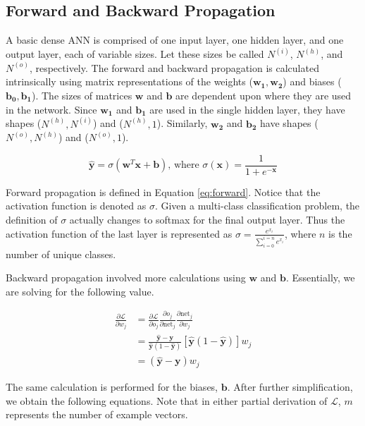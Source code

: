 \documentclass[letterpaper]{article} %
\begin{document}
\subsection{Forward and Backward Propagation}
A basic dense ANN is comprised of one input layer, one hidden layer,
and one output layer, each of variable sizes.
Let these sizes be called $N^{(i)}$, $N^{(h)}$, and $N^{(o)}$, respectively.
The forward and backward propagation
is calculated intrinsically using matrix representations of the
weights ($\mathbf{w_1},\mathbf{w_2}$) and biases ($\mathbf{b_0},\mathbf{b_1}$).
The sizes of matrices $\mathbf{w}$ and $\mathbf{b}$ are dependent upon where they are used
in the network.
Since $\mathbf{w_1}$ and $\mathbf{b_1}$ are used in the single hidden layer,
they have shapes
($N^{(h)}, N^{(i)}$) and ($N^{(h)}, 1$).
Similarly, $\mathbf{w_2}$ and $\mathbf{b_2}$ have shapes
($N^{(o)}, N^{(h)}$) and ($N^{(o)}, 1$).

\begin{equation}
\label{eq:forward}
\hat{\mathbf{y}} = \sigma(\mathbf{w}^T\mathbf{x} + \mathbf{b}) \text{, where } \sigma(\mathbf{x}) = \frac{1}{1 + e^{-\mathbf{x}}}
\end{equation}

Forward propagation is defined in Equation \ref{eq:forward}.
Notice that the activation function is denoted as $\sigma$.
Given a multi-class classification problem,
the definition of $\sigma$ actually changes to softmax for the final output layer.
Thus the activation function of the last layer is represented as
$\sigma = \frac{e^{x_i}}{\sum_{i=0}^{i=n}e^{x_i}}$,
where $n$ is the number of unique classes.

Backward propagation involved more calculations using $\mathbf{w}$ and $\mathbf{b}$.
Essentially, we are solving for the following value.

\begin{equation}
\label{eq:backward}
\begin{split}
\frac{\partial \mathcal{L}}{\partial w_j} &=
\frac{\partial \mathcal{L}}{\partial o_j}
\frac{\partial o_j}{\partial \text{net}_j}
\frac{\partial \text{net}_j}{\partial w_j} \\
&=
\frac{\hat{\mathbf{y}} - \mathbf{y}}{\hat{\mathbf{y}}(1 - \hat{\mathbf{y}})}
[\hat{\mathbf{y}}(1 - \hat{\mathbf{y}})]
w_j \\
&=
(\hat{\mathbf{y}} - \mathbf{y})w_j
\end{split}
\end{equation}

The same calculation is performed for the biases, $\mathbf{b}$.
After further simplification, we obtain the following equations.
Note that in either partial derivation of $\mathcal{L}$,
$m$ represents the number of example vectors.
\end{document}
